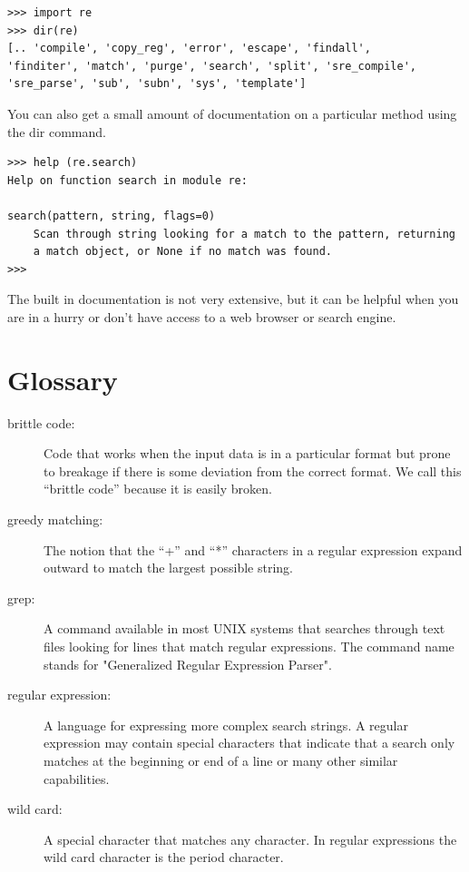 \documentclass[11pt]{book}
\begin{document}
\beforeverb
\begin{verbatim}
>>> import re
>>> dir(re)
[.. 'compile', 'copy_reg', 'error', 'escape', 'findall', 
'finditer', 'match', 'purge', 'search', 'split', 'sre_compile', 
'sre_parse', 'sub', 'subn', 'sys', 'template']
\end{verbatim}
\afterverb
%
You can also get a small amount of documentation on a particular method using the dir command.

\beforeverb
\begin{verbatim}
>>> help (re.search)
Help on function search in module re:

search(pattern, string, flags=0)
    Scan through string looking for a match to the pattern, returning
    a match object, or None if no match was found.
>>> 
\end{verbatim}
\afterverb
%
The built in documentation is not very extensive, but it can be helpful when you are in a hurry
or don't have access to a web browser or search engine.

\section{Glossary}

\begin{description}

\item[brittle code:]
Code that works when the input data is in a particular format but prone to breakage
if there is some deviation from the correct format.  We call this ``brittle code'' 
because it is easily broken.

\item[greedy matching:]
The notion that the ``+'' and ``*'' characters in a regular expression expand outward to match the largest possible string.

\item[grep:]
A command available in most UNIX systems that searches through text files looking for lines that match regular expressions.  The command name stands for "Generalized Regular Expression Parser".

\item[regular expression:]
A language for expressing more complex search strings.  A regular expression may contain special characters that indicate that a search only matches at the beginning or end of a line or many other similar capabilities.

\item[wild card:]
A special character that matches any character.   In regular expressions the wild card character is the period character.

\end{description}
\end{document}
